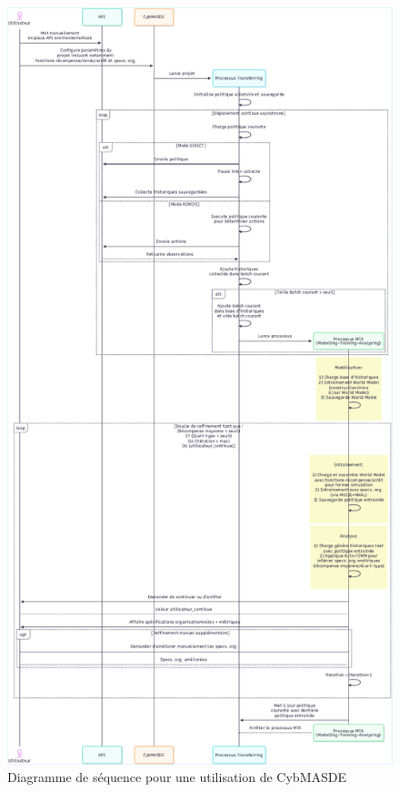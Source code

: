 \begin{figure}
  \includegraphics[trim={0cm 0cm 0cm 0cm},clip,height=\textheight]{figures/diagramme_sequence_CybMASDE.pdf}
  \caption{Diagramme de séquence pour une utilisation de CybMASDE}
  \label{fig:cybmasde_sequence}
\end{figure}

